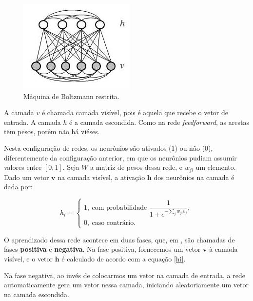 \documentclass{article}
\begin{document}
            \begin{figure}[h!]
                \centering
                \includegraphics[scale=0.5]{Images/Restricted Boltzmann machine.png}
                \caption{Máquina de Boltzmann restrita.}
                \label{fig3}
            \end{figure}

            A camada $v$ é chamada camada visível, pois é aquela que recebe o vetor de entrada.
            A camada $h$ é a camada escondida. Como na rede \textit{feedforward}, as arestas têm pesos, porém não há viéses.

            Nesta configuração de redes, os neurônios são ativados ($1$) ou não ($0$), diferentemente da configuração anterior, em que os neurônios pudiam assumir valores entre $[0, 1]$.
            Seja $W$ a matriz de pesos dessa rede, e $w_{ji}$ um elemento.
            Dado um vetor $\mathbf{v}$ na camada visível, a ativação $\mathbf{h}$ dos neurônios na camada é dada por:

            \begin{equation}
                h_i =   \begin{cases}
                            1, \ \textrm{com probabilidade } \dfrac{1}{1 + e^{-\sum_j w_{ji} v_j}},\\
                            0, \ \textrm{caso contrário}.
                        \end{cases}
                \label{hi}
            \end{equation}

            O aprendizado dessa rede acontece em duas fases, que, em \cite{testolin2018deep}, são chamadas de fases \textbf{positiva} e \textbf{negativa}.
            Na fase positiva, fornecemos um vetor $\mathbf{v}$ à camada visível, e o vetor $\mathbf{h}$ é calculado de acordo com a equação \ref{hi}.

            Na fase negativa, ao invés de colocarmos um vetor na camada de entrada, a rede automaticamente gera um vetor nessa camada, iniciando aleatoriamente um vetor na camada escondida.
\end{document}
